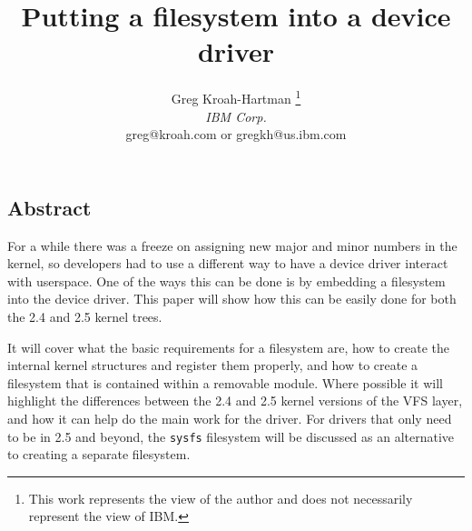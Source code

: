 \documentclass[twocolumn]{article}
\begin{document}
\date{}

\title{\Large \bf Putting a filesystem into a device driver}

\author{
Greg Kroah-Hartman 
\thanks{This work represents the view of the author and does not necessarily represent the view of IBM.}
\\{\em IBM Corp.}
\\{\normalsize greg@kroah.com or gregkh@us.ibm.com}
}

\maketitle


\thispagestyle{empty}

\newcommand{\code}[1]{{\ttfamily #1}}
\newenvironment{pithy}{\begin{verse}}{\end{verse}}


\subsection*{Abstract}
For a while there was a freeze on assigning new major and minor numbers in the
kernel, so developers had to use a different way to have a device driver
interact with userspace.  One of the ways this can be done is by embedding
a filesystem into the device driver. This paper will show how this can be
easily done for both the 2.4 and 2.5 kernel trees.

It will cover what the basic requirements for a filesystem are, how to create
the internal kernel structures and register them properly, and how to create a
filesystem that is contained within a removable module.  Where possible it
will highlight the differences between the 2.4 and 2.5 kernel versions of
the VFS layer, and how it can help do the main work for the driver.  For
drivers that only need to be in 2.5 and beyond, the {\tt sysfs} filesystem
will be discussed as an alternative to creating a separate filesystem.
\end{document}

